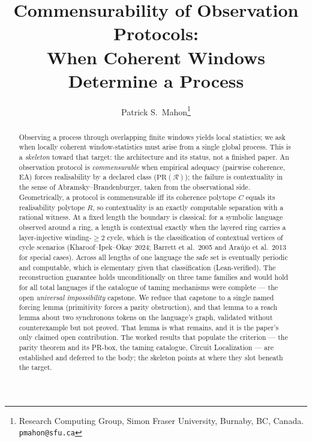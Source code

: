 \documentclass[11pt]{article}
\title{Commensurability of Observation Protocols:\\
When Coherent Windows Determine a Process}
\author{Patrick S.\ Mahon\thanks{%
  Research Computing Group, Simon Fraser University, Burnaby, BC, Canada.
  \texttt{pmahon@sfu.ca}}}
\date{}
\theoremstyle{definition}
\newcommand{\Rc}{\mathcal{R}}
\newcommand{\EA}{\mathrm{EA}}
\newcommand{\PR}{\mathrm{PR}}
\newif\ifstandalone
\begin{document}
\maketitle

\begin{abstract}
Observing a process through overlapping finite windows yields local statistics; we
ask when locally coherent window-statistics must arise from a single global
process. This is a \emph{skeleton} toward that target: the architecture and its
status, not a finished paper. An observation protocol is \emph{commensurable} when
empirical adequacy (pairwise coherence, $\EA$) forces realisability by a declared
class ($\PR(\Rc)$); the failure is contextuality in the sense of
Abramsky--Brandenburger, taken from the observational side. Geometrically, a
protocol is commensurable iff its coherence polytope $C$ equals its realisability
polytope $R$, so contextuality is an exactly computable separation with a rational
witness. At a fixed length the boundary is classical: for a symbolic language
observed around a ring, a length is contextual exactly when the layered ring
carries a layer-injective winding-$\ge2$ cycle, which is the classification of
contextual vertices of cycle scenarios (Kharoof--Ipek--Okay 2024; Barrett et al.\
2005 and Ara\'ujo et al.\ 2013 for special cases). Across all lengths of one
language the safe set is eventually periodic and computable, which is elementary
given that classification (Lean-verified). The
reconstruction guarantee holds unconditionally on three tame families and would
hold for all total languages if the catalogue of taming mechanisms were complete
--- the open \emph{universal impossibility} capstone. We reduce that capstone to a
single named forcing lemma (primitivity forces a parity obstruction), and that
lemma to a reach lemma about two synchronous tokens on the language's graph,
validated without counterexample but not proved. That lemma is what remains, and
it is the paper's only claimed open contribution. The
worked results that populate the criterion --- the parity theorem and its PR-box,
the taming catalogue, Circuit Localization --- are established and deferred to the
body; the skeleton points at where they slot beneath the target.
\end{abstract}

\ifstandalone



\fi
\end{document}
